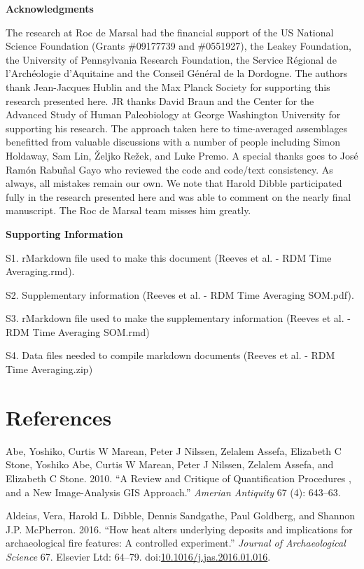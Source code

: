 \documentclass[smallextended]{svjour3}       %
\begin{document}
\textbf{Acknowledgments}

The research at Roc de Marsal had the financial support of the US
National Science Foundation (Grants \#09177739 and \#0551927), the
Leakey Foundation, the University of Pennsylvania Research Foundation,
the Service Régional de l'Archéologie d'Aquitaine and the Conseil
Général de la Dordogne. The authors thank Jean-Jacques Hublin and the
Max Planck Society for supporting this research presented here. JR
thanks David Braun and the Center for the Advanced Study of Human
Paleobiology at George Washington University for supporting his
research. The approach taken here to time-averaged assemblages
benefitted from valuable discussions with a number of people including
Simon Holdaway, Sam Lin, Željko Režek, and Luke Premo. A special thanks
goes to José Ramón Rabuñal Gayo who reviewed the code and code/text
consistency. As always, all mistakes remain our own. We note that Harold
Dibble participated fully in the research presented here and was able to
comment on the nearly final manuscript. The Roc de Marsal team misses
him greatly.

\textbf{Supporting Information}

S1. rMarkdown file used to make this document (Reeves et al. - RDM Time
Averaging.rmd).

S2. Supplementary information (Reeves et al. - RDM Time Averaging
SOM.pdf).

S3. rMarkdown file used to make the supplementary information (Reeves et
al. - RDM Time Averaging SOM.rmd)

S4. Data files needed to compile markdown documents (Reeves et al. - RDM
Time Averaging.zip)

\section*{References}\label{references}

\hypertarget{refs}{}
\hypertarget{ref-Abe2010}{}
Abe, Yoshiko, Curtis W Marean, Peter J Nilssen, Zelalem Assefa,
Elizabeth C Stone, Yoshiko Abe, Curtis W Marean, Peter J Nilssen,
Zelalem Assefa, and Elizabeth C Stone. 2010. ``A Review and Critique of
Quantification Procedures , and a New Image-Analysis GIS Approach.''
\emph{Amerian Antiquity} 67 (4): 643--63.

\hypertarget{ref-Aldeias2016}{}
Aldeias, Vera, Harold L. Dibble, Dennis Sandgathe, Paul Goldberg, and
Shannon J.P. McPherron. 2016. ``How heat alters underlying deposits and
implications for archaeological fire features: A controlled
experiment.'' \emph{Journal of Archaeological Science} 67. Elsevier Ltd:
64--79.
doi:\href{https://doi.org/10.1016/j.jas.2016.01.016}{10.1016/j.jas.2016.01.016}.
\end{document}
